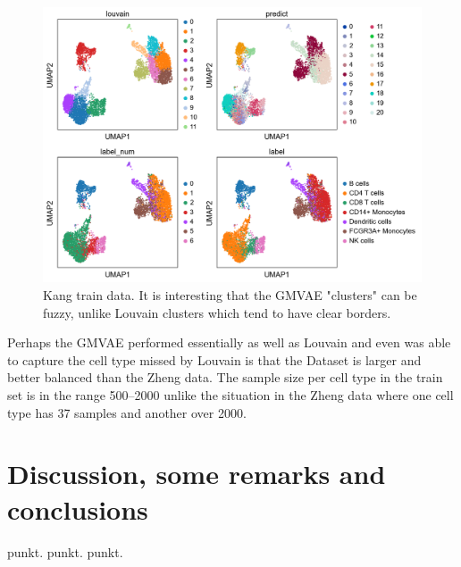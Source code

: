 \documentclass[11pt, a4paper]{report}
\theoremstyle{plain}
\theoremstyle{definition}
\theoremstyle{remark}
\begin{document}
\begin{figure}[h]
\centering
\includegraphics[width=1.1\textwidth]{images/gmmvae_Kang_control_train_us_21c_umap.png}
\caption{
Kang train data. It is interesting that the GMVAE "clusters" can be fuzzy,
unlike Louvain clusters which tend to have clear borders.
}
\label{fig:kang_control_train_gmvae_us_umap}
\end{figure}

Perhaps the GMVAE performed essentially as well as Louvain and even was able to
capture the cell type missed by Louvain is that the Dataset is larger and
better balanced than the Zheng data.
The sample size per cell type in the train set is in the range 500--2000 unlike
the situation in the Zheng data where one cell type has 37 samples and another
over 2000.


\chapter{Discussion, some remarks and conclusions}
punkt.
punkt.
punkt.



\end{document}
